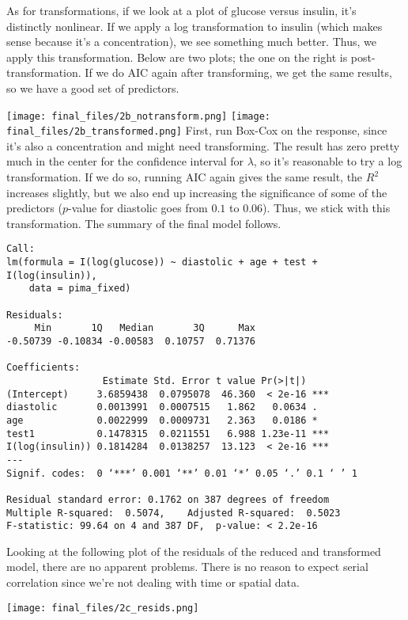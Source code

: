 \documentclass{article}
\begin{document}
As for transformations, if we look at a plot of glucose versus insulin, it's distinctly nonlinear. If we apply a log transformation to insulin (which makes sense because it's a concentration), we see something much better. Thus, we apply this transformation. Below are two plots; the one on the right is post-transformation. If we do AIC again after transforming, we get the same results, so we have a good set of predictors.

\noindent\texttt{[image: final\_files/2b\_notransform.png]}
\texttt{[image: final\_files/2b\_transformed.png]}
First, run Box-Cox on the response, since it's also a concentration and might need transforming. The result has zero pretty much in the center for the confidence interval for $\lambda$, so it's reasonable to try a log transformation. If we do so, running AIC again gives the same result, the $R^2$ increases slightly, but we also end up increasing the significance of some of the predictors ($p$-value for diastolic goes from $0.1$ to $0.06$). Thus, we stick with this transformation. The summary of the final model follows.

\begin{verbatim}
Call:
lm(formula = I(log(glucose)) ~ diastolic + age + test + I(log(insulin)), 
    data = pima_fixed)

Residuals:
     Min       1Q   Median       3Q      Max 
-0.50739 -0.10834 -0.00583  0.10757  0.71376 

Coefficients:
                 Estimate Std. Error t value Pr(>|t|)    
(Intercept)     3.6859438  0.0795078  46.360  < 2e-16 ***
diastolic       0.0013991  0.0007515   1.862   0.0634 .  
age             0.0022999  0.0009731   2.363   0.0186 *  
test1           0.1478315  0.0211551   6.988 1.23e-11 ***
I(log(insulin)) 0.1814284  0.0138257  13.123  < 2e-16 ***
---
Signif. codes:  0 ‘***’ 0.001 ‘**’ 0.01 ‘*’ 0.05 ‘.’ 0.1 ‘ ’ 1

Residual standard error: 0.1762 on 387 degrees of freedom
Multiple R-squared:  0.5074,    Adjusted R-squared:  0.5023 
F-statistic: 99.64 on 4 and 387 DF,  p-value: < 2.2e-16
\end{verbatim}

Looking at the following plot of the residuals of the reduced and transformed model, there are no apparent problems. There is no reason to expect serial correlation since we're not dealing with time or spatial data.

\texttt{[image: final\_files/2c\_resids.png]}
\end{document}
